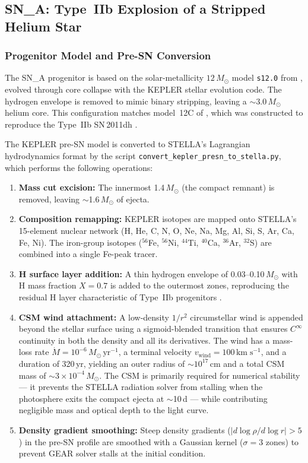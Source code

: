 \documentclass[11pt, a4paper]{article}
\newcommand{\Msun}{\ensuremath{M_\odot}}
\newcommand{\kms}{\ensuremath{\mathrm{km\;s^{-1}}}}
\newcommand{\vwind}{\ensuremath{v_{\mathrm{wind}}}}
\newcommand{\mdot}{\ensuremath{\dot{M}}}
\begin{document}
\subsection{SN\_A: Type~IIb Explosion of a Stripped Helium Star}
\label{subsec:sn_a}

\subsubsection{Progenitor Model and Pre-SN Conversion}
\label{subsubsec:progenitor}

The SN\_A progenitor is based on the solar-metallicity $12\,M_\odot$ model
\texttt{s12.0} from \citet{WoosleyHeger2007}, evolved through core collapse
with the KEPLER stellar evolution code.  The hydrogen envelope is removed to
mimic binary stripping, leaving a $\sim$3.0\,$\Msun$ helium core.  This
configuration matches model~12C of \citet{Ergon2022}, which was constructed to
reproduce the Type~IIb SN\,2011dh \citep{Ergon2015}.

The KEPLER pre-SN model is converted to STELLA's Lagrangian hydrodynamics
format by the script \texttt{convert\_kepler\_presn\_to\_stella.py}, which
performs the following operations:
\begin{enumerate}
    \item \textbf{Mass cut excision:} The innermost 1.4\,$\Msun$ (the compact
    remnant) is removed, leaving $\sim$1.6\,$\Msun$ of ejecta.
    \item \textbf{Composition remapping:} KEPLER isotopes are mapped onto
    STELLA's 15-element nuclear network (H, He, C, N, O, Ne, Na, Mg, Al, Si,
    S, Ar, Ca, Fe, Ni).  The iron-group isotopes ($^{56}$Fe, $^{56}$Ni,
    $^{44}$Ti, $^{40}$Ca, $^{36}$Ar, $^{32}$S) are combined into a single
    Fe-peak tracer.
    \item \textbf{H surface layer addition:} A thin hydrogen envelope of
    0.03--0.10\,$\Msun$ with H mass fraction $X = 0.7$ is added to the
    outermost zones, reproducing the residual H layer characteristic of
    Type~IIb progenitors \citep{Ergon2022}.
    \item \textbf{CSM wind attachment:} A low-density $1/r^2$ circumstellar
    wind is appended beyond the stellar surface using a sigmoid-blended
    transition that ensures $C^\infty$ continuity in both the density and
    all its derivatives.  The wind has a mass-loss rate
    $\mdot = 10^{-6}\,\Msun\,\mathrm{yr^{-1}}$, a terminal velocity
    $\vwind = 100\,\kms$, and a duration of 320\,yr, yielding an outer radius
    of $\sim$$10^{17}$\,cm and a total CSM mass of $\sim$$3 \times
    10^{-4}\,\Msun$.  The CSM is primarily required for numerical stability
    --- it prevents the STELLA radiation solver from stalling when the
    photosphere exits the compact ejecta at $\sim$10\,d --- while contributing
    negligible mass and optical depth to the light curve.
    \item \textbf{Density gradient smoothing:} Steep density gradients
    ($|d\log\rho / d\log r| > 5$) in the pre-SN profile are smoothed with a
    Gaussian kernel ($\sigma = 3$ zones) to prevent GEAR solver stalls at
    the initial condition.
\end{enumerate}
\end{document}
